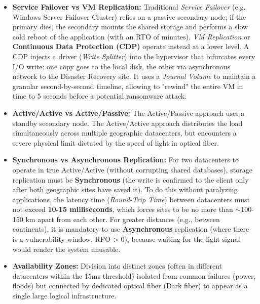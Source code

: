 \begin{itemize}
    \item \textbf{Service Failover vs VM Replication:} Traditional \textit{Service Failover} (e.g. Windows Server Failover Cluster) relies on a passive secondary node; if the primary dies, the secondary mounts the shared storage and performs a slow cold reboot of the application (with an RTO of minutes). \textit{VM Replication} or \textbf{Continuous Data Protection (CDP)} operate instead at a lower level. A CDP injects a driver (\textit{Write Splitter}) into the hypervisor that bifurcates every I/O write: one copy goes to the local disk, the other via asynchronous network to the Disaster Recovery site. It uses a \textit{Journal Volume} to maintain a granular second-by-second timeline, allowing to "rewind" the entire VM in time to 5 seconds before a potential ransomware attack.
    \item \textbf{Active/Active vs Active/Passive:} The Active/Passive approach uses a standby secondary node. The Active/Active approach distributes the load simultaneously across multiple geographic datacenters, but encounters a severe physical limit dictated by the speed of light in optical fiber.
    \item \textbf{Synchronous vs Asynchronous Replication:} For two datacenters to operate in true Active/Active (without corrupting shared databases), storage replication must be \textbf{Synchronous} (the write is confirmed to the client only after both geographic sites have saved it). To do this without paralyzing applications, the latency time (\textit{Round-Trip Time}) between datacenters must not exceed \textbf{10-15 milliseconds}, which forces sites to be no more than $\sim$100-150 km apart from each other. For greater distances (e.g., between continents), it is mandatory to use \textbf{Asynchronous} replication (where there is a vulnerability window, RPO > 0), because waiting for the light signal would render the system unusable.
    \item \textbf{Availability Zones:} Division into distinct zones (often in different datacenters within the 15ms threshold) isolated from common failures (power, floods) but connected by dedicated optical fiber (Dark fiber) to appear as a single large logical infrastructure.
\end{itemize}

